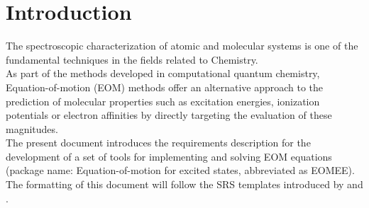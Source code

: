 \documentclass[12pt]{article}
\begin{document}


\section{Introduction}


The spectroscopic characterization of atomic and molecular systems is one 
of the fundamental techniques in the fields related to Chemistry. \\
As part of 
the methods developed in computational quantum chemistry, Equation-of-motion 
(EOM) methods offer an alternative approach to the prediction of molecular 
properties such as excitation energies, ionization potentials or electron 
affinities by directly targeting the evaluation of these magnitudes.\\ 
The present document introduces the requirements description for the 
development of a set of tools for implementing and solving EOM 
equations (package name: Equation-of-motion for excited states, abbreviated as 
EOMEE). The formatting of this document will follow the SRS templates 
introduced 
by 
\cite{Smith2016} and \cite{SmithEtAl2007}.
\end{document}
